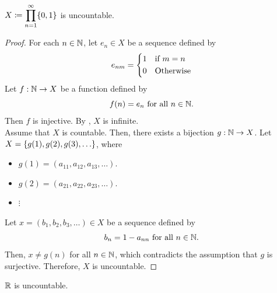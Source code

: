 \bigskip

\begin{lemma} \label{lem:InfiniteProductOfFiniteSetsIsUncountable}
    $X \coloneqq \displaystyle \prod_{n = 1}^{\infty} \set*{0, 1}$ is uncountable.
\end{lemma}

\begin{proof}
    For each $n \in \mathbb{N}$, let $e_{n} \in X$ be a sequence defined by
    \[
    e_{nm} = \begin{dcases}
        1 & \text{if } m = n \\
        0 & \text{Otherwise}
    \end{dcases}
    \]
    Let $f: \mathbb{N} \to X$ be a function defined by
    \[
    f(n) = e_{n} \text{ for all } n \in \mathbb{N}.
    \]
    Then $f$ is injective. By , $X$ is infinite.
    \\[6mm]
    Assume that $X$ is countable. Then, there exists a bijection $g: \mathbb{N} \to X$.
    Let $X = \set*{g(1), g(2), g(3), \dots}$, where
    \begin{itemize}
        \item $g(1) = (a_{11}, a_{12}, a_{13}, \dots)$.
        \item $g(2) = (a_{21}, a_{22}, a_{23}, \dots)$.
        \item[] $\vdots$
    \end{itemize}
    Let $x = (b_{1}, b_{2}, b_{3}, \dots) \in X$ be a sequence defined by
    \[
    b_{n} = 1 - a_{nn} \text{ for all } n \in \mathbb{N}.
    \]
    Then, $x \neq g(n)$ for all $n \in \mathbb{N}$, which contradicts the assumption that $g$ is surjective.
    Therefore, $X$ is uncountable.
\end{proof}

\bigskip

\begin{theorem} \label{thm:RIsUncountable}
    $\mathbb{R}$ is uncountable.
\end{theorem}

